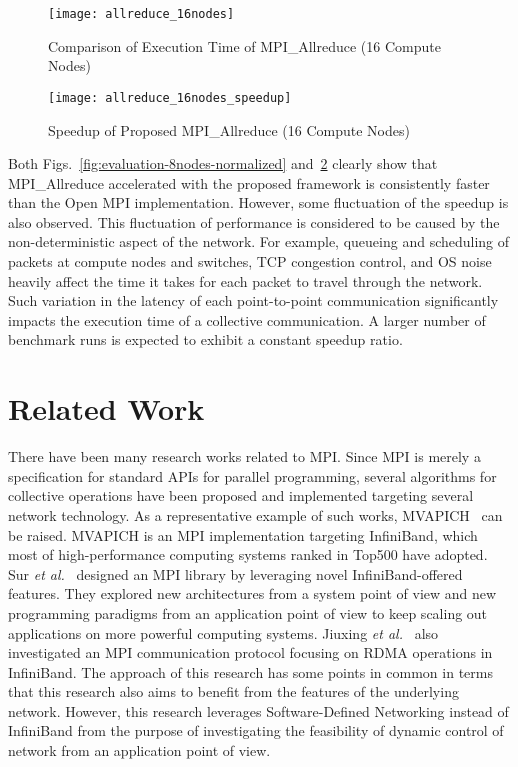 \begin{figure}
    \centering
    \texttt{[image: allreduce\_16nodes]}
    \caption{Comparison of Execution Time of MPI\_Allreduce (16 Compute Nodes)}%
    \label{fig:evaluation-16nodes}
\end{figure}

\begin{figure}
    \centering
    \texttt{[image: allreduce\_16nodes\_speedup]}
    \caption{Speedup of Proposed MPI\_Allreduce (16 Compute Nodes)}%
    \label{fig:evaluation-16nodes-normalized}
\end{figure}

Both Figs.~\ref{fig:evaluation-8nodes-normalized}
and~\ref{fig:evaluation-16nodes-normalized} clearly show that MPI\_Allreduce
accelerated with the proposed framework is consistently faster than the Open
MPI implementation. However, some fluctuation of the speedup is also observed.
This fluctuation of performance is considered to be caused by the
non-deterministic aspect of the network. For example, queueing and scheduling
of packets at compute nodes and switches, TCP congestion control, and OS noise
heavily affect the time it takes for each packet to travel through the
network. Such variation in the latency of each point-to-point communication
significantly impacts the execution time of a collective communication. A
larger number of benchmark runs is expected to exhibit a constant speedup
ratio.

\section{Related Work}\label{sec:iii-related-work}

There have been many research works related to MPI\@. Since MPI is merely a
specification for standard APIs for parallel programming, several algorithms
for collective operations have been proposed and implemented targeting several
network technology. As a representative example of such works,
MVAPICH~\autocite{mvapich} can be raised. MVAPICH is an MPI implementation
targeting InfiniBand, which most of high-performance computing systems ranked
in Top500 have adopted. Sur \emph{et al.}~\autocite{Sur2011} designed an MPI
library by leveraging novel InfiniBand-offered features. They explored new
architectures from a system point of view and new programming paradigms from
an application point of view to keep scaling out applications on more powerful
computing systems. Jiuxing \emph{et al.}~\autocite{Jiuxing2004} also
investigated an MPI communication protocol focusing on RDMA operations in
InfiniBand. The approach of this research has some points in common in terms
that this research also aims to benefit from the features of the underlying
network. However, this research leverages Software-Defined Networking instead
of InfiniBand from the purpose of investigating the feasibility of dynamic
control of network from an application point of view.

